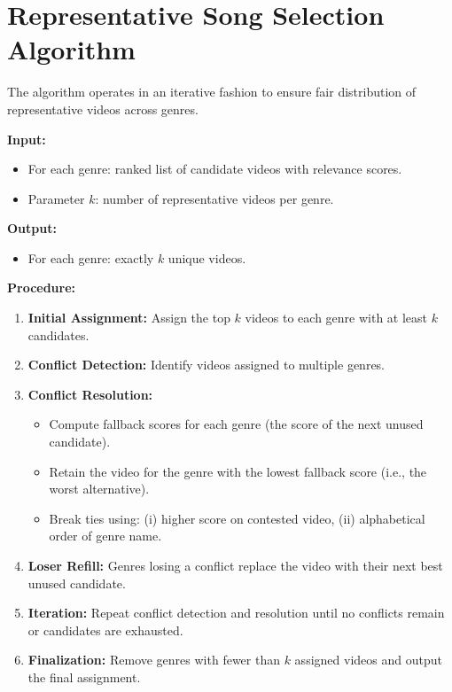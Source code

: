 \cleardoubleoddpage

\chapter{Representative Song Selection Algorithm}
\label{appendix:selection_algorithm}

The algorithm operates in an iterative fashion to ensure fair distribution of representative videos across genres.

\textbf{Input:}  
\begin{itemize}
    \item For each genre: ranked list of candidate videos with relevance scores.
    \item Parameter $k$: number of representative videos per genre.
\end{itemize}

\textbf{Output:}  
\begin{itemize}
    \item For each genre: exactly $k$ unique videos.
\end{itemize}

\textbf{Procedure:}  
\begin{enumerate}
    \item \textbf{Initial Assignment:}  
    Assign the top $k$ videos to each genre with at least $k$ candidates.
    \item \textbf{Conflict Detection:}  
    Identify videos assigned to multiple genres.
    \item \textbf{Conflict Resolution:}  
    \begin{itemize}
        \item Compute fallback scores for each genre (the score of the next unused candidate).
        \item Retain the video for the genre with the lowest fallback score (i.e., the worst alternative).
        \item Break ties using: (i) higher score on contested video, (ii) alphabetical order of genre name.
    \end{itemize}
    \item \textbf{Loser Refill:}  
    Genres losing a conflict replace the video with their next best unused candidate.
    \item \textbf{Iteration:}  
    Repeat conflict detection and resolution until no conflicts remain or candidates are exhausted.
    \item \textbf{Finalization:}  
    Remove genres with fewer than $k$ assigned videos and output the final assignment.
\end{enumerate}
